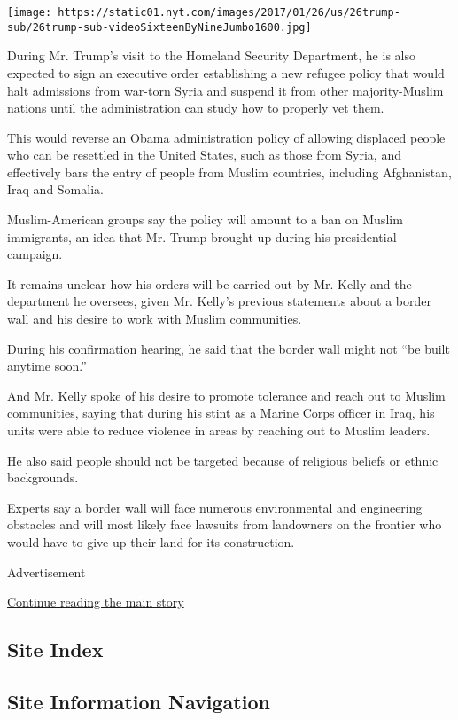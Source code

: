 \texttt{[image: https://static01.nyt.com/images/2017/01/26/us/26trump-sub/26trump-sub-videoSixteenByNineJumbo1600.jpg]}

During Mr. Trump's visit to the Homeland Security Department, he is also
expected to sign an executive order establishing a new refugee policy
that would halt admissions from war-torn Syria and suspend it from other
majority-Muslim nations until the administration can study how to
properly vet them.

This would reverse an Obama administration policy of allowing displaced
people who can be resettled in the United States, such as those from
Syria, and effectively bars the entry of people from Muslim countries,
including Afghanistan, Iraq and Somalia.

Muslim-American groups say the policy will amount to a ban on Muslim
immigrants, an idea that Mr. Trump brought up during his presidential
campaign.

It remains unclear how his orders will be carried out by Mr. Kelly and
the department he oversees, given Mr. Kelly's previous statements about
a border wall and his desire to work with Muslim communities.

During his confirmation hearing, he said that the border wall might not
``be built anytime soon.''

And Mr. Kelly spoke of his desire to promote tolerance and reach out to
Muslim communities, saying that during his stint as a Marine Corps
officer in Iraq, his units were able to reduce violence in areas by
reaching out to Muslim leaders.

He also said people should not be targeted because of religious beliefs
or ethnic backgrounds.

Experts say a border wall will face numerous environmental and
engineering obstacles and will most likely face lawsuits from landowners
on the frontier who would have to give up their land for its
construction.

Advertisement

\protect\hyperlink{after-bottom}{Continue reading the main story}

\hypertarget{site-index}{%
\subsection{Site Index}\label{site-index}}

\hypertarget{site-information-navigation}{%
\subsection{Site Information
Navigation}\label{site-information-navigation}}

